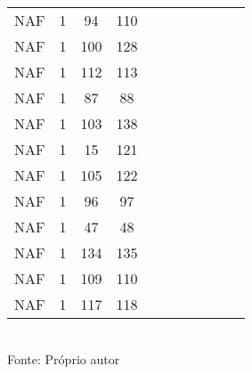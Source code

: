 \begin{table}[H]
{\begin{tabular}{ccccccccccc}
NAF & 1 & 94 & 110 &  &  &  &  &  &  &  \\
NAF & 1 & 100 & 128 &  &  &  &  &  &  &  \\
NAF & 1 & 112 & 113 &  &  &  &  &  &  &  \\
NAF & 1 & 87 & 88 &  &  &  &  &  &  &  \\
NAF & 1 & 103 & 138 &  &  &  &  &  &  &  \\
NAF & 1 & 15 & 121 &  &  &  &  &  &  &  \\
NAF & 1 & 105 & 122 &  &  &  &  &  &  &  \\
NAF & 1 & 96 & 97 &  &  &  &  &  &  &  \\
NAF & 1 & 47 & 48 &  &  &  &  &  &  &  \\
NAF & 1 & 134 & 135 &  &  &  &  &  &  &  \\
NAF & 1 & 109 & 110 &  &  &  &  &  &  &  \\
NAF & 1 & 117 & 118 &  &  &  &  &  &  &  \\
\bottomrule
\end{tabular}}
\\Fonte: Próprio autor
\end{table}


